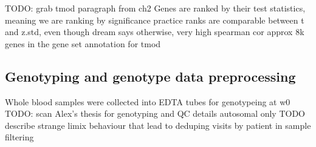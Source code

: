 \begin{outline}
\1 TODO: grab tmod paragraph from ch2
    \2 Genes are ranked by their test statistics, meaning we are ranking by significance
        \3 practice ranks are comparable between t and z.std, even though dream says otherwise, very high spearman cor
    \2 approx 8k genes in the gene set annotation for tmod

\subsection{Genotyping and genotype data preprocessing}

%
%
%
%

\1 Whole blood samples were collected into EDTA tubes for genotypeing at w0
\1 TODO: scan Alex's thesis for genotyping and QC details
    \2 autosomal only
    \2 TODO describe strange limix behaviour that lead to deduping visits by patient in sample filtering


\end{outline}
